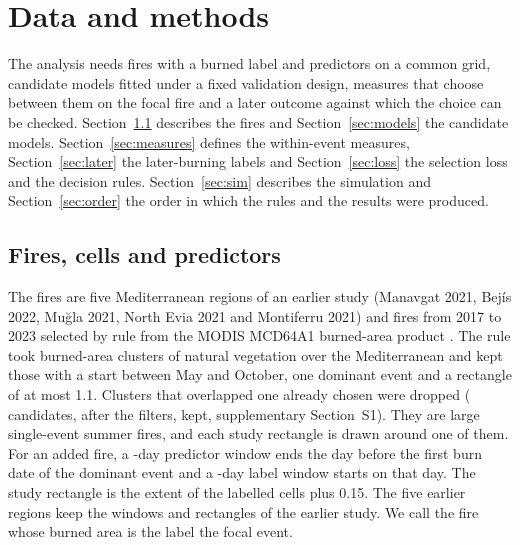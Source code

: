 \documentclass[preprint,12pt,authoryear]{elsarticle}
\begin{document}
\section{Data and methods}
\label{sec:methods}

The analysis needs fires with a burned label and predictors on a common grid, candidate models fitted under a fixed validation design, measures that choose between them on the focal fire and a later outcome against which the choice can be checked. Section~\ref{sec:fires} describes the fires and Section~\ref{sec:models} the candidate models. Section~\ref{sec:measures} defines the within-event measures, Section~\ref{sec:later} the later-burning labels and Section~\ref{sec:loss} the selection loss and the decision rules. Section~\ref{sec:sim} describes the simulation and Section~\ref{sec:order} the order in which the rules and the results were produced.

\subsection{Fires, cells and predictors}
\label{sec:fires}

The fires are five Mediterranean regions of an earlier study (Manavgat 2021, Bej\'is 2022, Mu\u{g}la 2021, North Evia 2021 and Montiferru 2021) and \vnAdded{} fires from 2017 to 2023 selected by rule from the MODIS MCD64A1 burned-area product \citep{MCD64A1,Giglio2018}. The rule took burned-area clusters of natural vegetation over the Mediterranean and kept those with a start between May and October, one dominant event and a rectangle of at most 1.1\textdegree{}. Clusters that overlapped one already chosen were dropped (\vselCandidates{} candidates, \vselPass{} after the filters, \vselKept{} kept, supplementary Section~S1). They are large single-event summer fires, and each study rectangle is drawn around one of them. For an added fire, a \vpredDays-day predictor window ends the day before the first burn date of the dominant event and a \vlabelDays-day label window starts on that day. The study rectangle is the extent of the labelled cells plus 0.15\textdegree{}. The five earlier regions keep the windows and rectangles of the earlier study. We call the fire whose burned area is the label the focal event.
\end{document}
